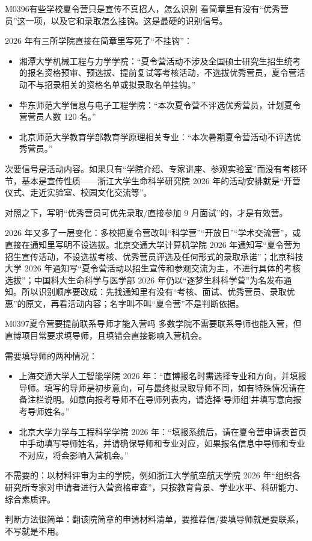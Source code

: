 \begin{qa}{M0396}{有些学校夏令营只是宣传不真招人，怎么识别}
看简章里有没有“优秀营员”这一项，以及它和录取怎么挂钩。这是最硬的识别信号。

2026 年有三所学院直接在简章里写死了“不挂钩”：
\begin{itemize}
  \item 湘潭大学机械工程与力学学院：“夏令营活动不涉及全国硕士研究生招生统考的报名资格预审、预选拔、提前复试等考核活动，不选拔优秀营员，夏令营活动不与招录相关的资格名单或拟录取名单挂钩。”
  \item 华东师范大学信息与电子工程学院：“本次夏令营不评选优秀营员，计划夏令营营员人数 120 名。”
  \item 北京师范大学教育学部教育学原理相关专业：“本次暑期夏令营活动不评选优秀营员。”
\end{itemize}

次要信号是活动内容。如果只有“学院介绍、专家讲座、参观实验室”而没有考核环节，基本是宣传性质——浙江大学生命科学研究院 2026 年的活动安排就是“开营仪式、走近实验室、校园文化交流等”。

对照之下，写明“优秀营员可优先录取/直接参加 9 月面试”的，才是有效营。

2026 年又多了一层变化：多校把夏令营改叫“科学营”“开放日”“学术交流营”，或直接在通知里写明不设选拔。北京交通大学计算机学院 2026 年通知写“夏令营为招生宣传活动，不设选拔考核、优秀营员评选及任何形式的录取承诺”；北京科技大学 2026 年通知写“夏令营活动以招生宣传和参观交流为主，不进行具体的考核选拔”；中国科大生命科学与医学部 2026 年仍以“逐梦生科科学营”为名发布通知。所以识别顺序要改成：先找通知里有没有“考核、面试、优秀营员、录取优惠”的原文，再看活动内容；名字叫不叫“夏令营”不是判断依据。
\end{qa}

\begin{qa}{M0397}{夏令营要提前联系导师才能入营吗}
多数学院不需要联系导师也能入营，但直博项目常要求填导师，且填错会直接影响入营机会。

需要填导师的两种情况：
\begin{itemize}
  \item 上海交通大学人工智能学院 2026 年：“直博报名时需选择专业和方向，并填报导师。填写的导师是初步意向，可与最终拟录取导师不同，如有特殊情况请在备注栏说明。如意向报考导师不在导师列表内，请选择‘导师组’并填写意向报考导师姓名。”
  \item 北京大学力学与工程科学学院 2026 年：“填报系统后，请在夏令营申请表首页中手动填写导师姓名，并请确保导师和专业对应，如果报名信息中导师和专业不对应，将会影响入营机会。”
\end{itemize}

不需要的：以材料评审为主的学院，例如浙江大学航空航天学院 2026 年“组织各研究所专家对申请者进行入营资格审查”，只按教育背景、学业水平、科研能力、综合素质评。

判断方法很简单：翻该院简章的申请材料清单，要推荐信/要填导师就是要联系，不写就是不用。
\end{qa}

